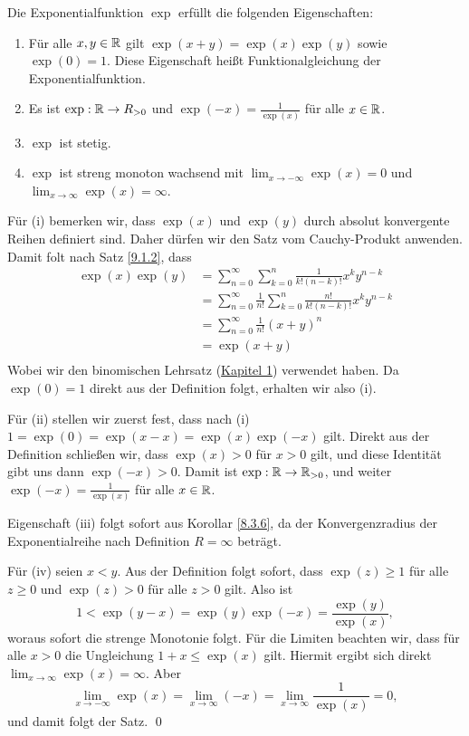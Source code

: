 \begin{subtheorem}
	Die Exponentialfunktion $ \exp  $ erfüllt die folgenden Eigenschaften:
	\begin{enumerate}[label=(\roman*)]
		\item Für alle $ x, y \in \mathbb{R}  $ gilt $ \exp (x + y) = \exp (x) \exp (y) $ sowie $ \exp (0) = 1 $. Diese Eigenschaft heißt Funktionalgleichung der Exponentialfunktion.
		\item Es ist $ \exp : \mathbb{R} \to R_{>0}  $ und $ \exp (-x) = \frac{ 1 }{ \exp (x) }  $ für alle $ x \in \mathbb{R}  $.
		\item $ \exp  $ ist stetig.
		\item $ \exp  $ ist streng monoton wachsend mit $ \lim_{x \to -\infty} \exp (x) = 0 $ und $ \lim_{x \to \infty} \exp (x) = \infty $.
	\end{enumerate}
\end{subtheorem}
\begin{subproof*}
	Für (i) bemerken wir, dass $ \exp (x) $ und $ \exp (y) $ durch absolut konvergente Reihen definiert sind. Daher dürfen wir den Satz vom Cauchy-Produkt anwenden. Damit folt nach Satz \ref{9.1.2}, dass
	\begin{align*}
		\exp (x)\exp (y) &= \sum_{n=0}^{\infty} \sum_{k=0}^{n} \frac{ 1 }{ k!(n-k)! } x^ky^{n-k}  \\
		~&= \sum_{n=0}^{\infty} \frac{ 1 }{ n! } \sum_{k=0}^{n} \frac{ n! }{ k!(n-k)! } x^ky^{n-k} \\
		~&= \sum_{n=0}^{\infty} \frac{ 1 }{ n! } (x + y)^n \\
		~&= \exp (x + y) \\
	\end{align*}
	Wobei wir den binomischen Lehrsatz (\hyperlink{section.1}{Kapitel 1}) verwendet haben. Da $ \exp (0) = 1 $ direkt aus der Definition folgt, erhalten wir also (i).

	Für (ii) stellen wir zuerst fest, dass nach (i) $ 1 = \exp (0) = \exp (x - x) = \exp (x) \exp (-x) $ gilt. Direkt aus der Definition schließen wir, dass $ \exp (x) > 0 $ für $ x > 0 $ gilt, und diese Identität gibt uns dann $ \exp (-x) > 0 $. Damit ist $ \exp : \mathbb{R} \to \mathbb{R}_{ >0 } $, und weiter $ \exp (-x) = \frac{ 1 }{ \exp (x) }  $ für alle $ x \in \mathbb{R}  $.

	Eigenschaft (iii) folgt sofort aus Korollar \ref{8.3.6}, da der Konvergenzradius der Exponentialreihe nach Definition $ R = \infty $ beträgt.

	Für (iv) seien $ x < y $. Aus der Definition folgt sofort, dass $ \exp (z) \geq 1 $ für alle $ z \geq 0 $ und $ \exp (z) > 0 $ für alle $ z > 0 $ gilt. Also ist
	\[
		1 < \exp ( y - x ) = \exp (y) \exp (-x) = \frac{ \exp (y) }{ \exp (x) } ,
	\]
	woraus sofort die strenge Monotonie folgt. Für die Limiten beachten wir, dass für alle $ x > 0 $ die Ungleichung $ 1 + x \leq \exp (x) $ gilt. Hiermit ergibt sich direkt $ \lim_{x \to \infty} \exp (x) = \infty $. Aber
	\[
		\lim_{x \to -\infty} \exp (x) = \lim_{x \to \infty} (-x) = \lim_{x \to \infty} \frac{ 1 }{ \exp (x) } = 0,
	\]
	und damit folgt der Satz. \qed
\end{subproof*}

